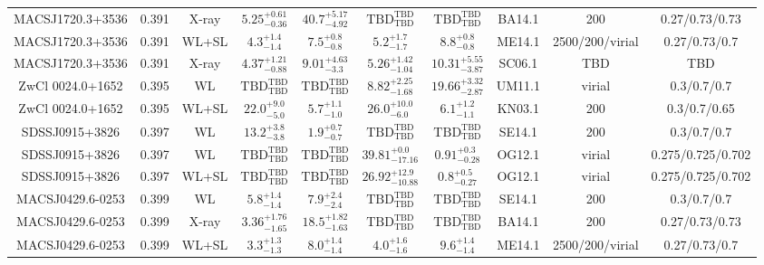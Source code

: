 \begin{table}
\begin{tabular}{cccccccccc}
MACSJ1720.3+3536 & 0.391 & X-ray & ${5.25}^{+0.61}_{-0.36}$ & ${40.7}^{+5.17}_{-4.92}$ & ${\mathrm{TBD}}^{\mathrm{TBD}}_{\mathrm{TBD}}$ & ${\mathrm{TBD}}^{\mathrm{TBD}}_{\mathrm{TBD}}$ & BA14.1 & 200 & 0.27/0.73/0.73 \\
MACSJ1720.3+3536 & 0.391 & WL+SL & ${4.3}^{+1.4}_{-1.4}$ & ${7.5}^{+0.8}_{-0.8}$ & ${5.2}^{+1.7}_{-1.7}$ & ${8.8}^{+0.8}_{-0.8}$ & ME14.1 & 2500/200/virial & 0.27/0.73/0.7 \\
MACSJ1720.3+3536 & 0.391 & X-ray & ${4.37}^{+1.21}_{-0.88}$ & ${9.01}^{+4.63}_{-3.3}$ & ${5.26}^{+1.42}_{-1.04}$ & ${10.31}^{+5.55}_{-3.87}$ & SC06.1 & TBD & TBD \\
ZwCl 0024.0+1652 & 0.395 & WL & ${\mathrm{TBD}}^{\mathrm{TBD}}_{\mathrm{TBD}}$ & ${\mathrm{TBD}}^{\mathrm{TBD}}_{\mathrm{TBD}}$ & ${8.82}^{+2.25}_{-1.68}$ & ${19.66}^{+3.32}_{-2.87}$ & UM11.1 & virial & 0.3/0.7/0.7 \\
ZwCl 0024.0+1652 & 0.395 & WL+SL & ${22.0}^{+9.0}_{-5.0}$ & ${5.7}^{+1.1}_{-1.0}$ & ${26.0}^{+10.0}_{-6.0}$ & ${6.1}^{+1.2}_{-1.1}$ & KN03.1 & 200 & 0.3/0.7/0.65 \\
SDSSJ0915+3826 & 0.397 & WL & ${13.2}^{+3.8}_{-3.8}$ & ${1.9}^{+0.7}_{-0.7}$ & ${\mathrm{TBD}}^{\mathrm{TBD}}_{\mathrm{TBD}}$ & ${\mathrm{TBD}}^{\mathrm{TBD}}_{\mathrm{TBD}}$ & SE14.1 & 200 & 0.3/0.7/0.7 \\
SDSSJ0915+3826 & 0.397 & WL & ${\mathrm{TBD}}^{\mathrm{TBD}}_{\mathrm{TBD}}$ & ${\mathrm{TBD}}^{\mathrm{TBD}}_{\mathrm{TBD}}$ & ${39.81}^{+0.0}_{-17.16}$ & ${0.91}^{+0.3}_{-0.28}$ & OG12.1 & virial & 0.275/0.725/0.702 \\
SDSSJ0915+3826 & 0.397 & WL+SL & ${\mathrm{TBD}}^{\mathrm{TBD}}_{\mathrm{TBD}}$ & ${\mathrm{TBD}}^{\mathrm{TBD}}_{\mathrm{TBD}}$ & ${26.92}^{+12.9}_{-10.88}$ & ${0.8}^{+0.5}_{-0.27}$ & OG12.1 & virial & 0.275/0.725/0.702 \\
MACSJ0429.6-0253 & 0.399 & WL & ${5.8}^{+1.4}_{-1.4}$ & ${7.9}^{+2.4}_{-2.4}$ & ${\mathrm{TBD}}^{\mathrm{TBD}}_{\mathrm{TBD}}$ & ${\mathrm{TBD}}^{\mathrm{TBD}}_{\mathrm{TBD}}$ & SE14.1 & 200 & 0.3/0.7/0.7 \\
MACSJ0429.6-0253 & 0.399 & X-ray & ${3.36}^{+1.76}_{-1.65}$ & ${18.5}^{+1.82}_{-1.63}$ & ${\mathrm{TBD}}^{\mathrm{TBD}}_{\mathrm{TBD}}$ & ${\mathrm{TBD}}^{\mathrm{TBD}}_{\mathrm{TBD}}$ & BA14.1 & 200 & 0.27/0.73/0.73 \\
MACSJ0429.6-0253 & 0.399 & WL+SL & ${3.3}^{+1.3}_{-1.3}$ & ${8.0}^{+1.4}_{-1.4}$ & ${4.0}^{+1.6}_{-1.6}$ & ${9.6}^{+1.4}_{-1.4}$ & ME14.1 & 2500/200/virial & 0.27/0.73/0.7 \\

\end{tabular}
\end{table}
